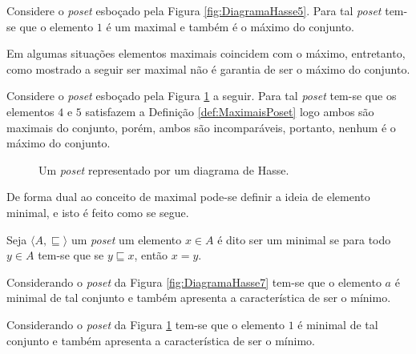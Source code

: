 \begin{exemplo}
	Considere o \textit{poset} esboçado pela Figura \ref{fig:DiagramaHasse5}. Para tal \textit{poset} tem-se que o elemento $1$ é um maximal e também é o máximo do conjunto.
\end{exemplo}

Em algumas situações elementos maximais coincidem com o máximo, entretanto, como mostrado a seguir ser maximal não é garantia de ser o máximo do conjunto.

\begin{exemplo}
  Considere o \textit{poset} esboçado pela Figura \ref{fig:DiagramaHasse8} a seguir. Para tal \textit{poset} tem-se que os elementos $4$ e $5$ satisfazem a Definição \ref{def:MaximaisPoset} logo ambos são maximais do conjunto, porém, ambos são incomparáveis, portanto, nenhum é o máximo do conjunto.
\end{exemplo}

\begin{figure}[h]
  \centering
{}
\caption{Um \textit{poset} representado por um diagrama de Hasse.}
\label{fig:DiagramaHasse8}
\end{figure}

De forma dual ao conceito de maximal pode-se definir a ideia de elemento minimal, e isto é feito como se segue.

\begin{definicao}\label{def:MinimalPoset}
Seja $\langle A, \sqsubseteq \rangle$ um \textit{poset}  um elemento $x \in A$ é dito ser um minimal se para todo $y \in A$ tem-se que se $y\sqsubseteq x$, então $x = y$.
\end{definicao}

\begin{exemplo}
Considerando o \textit{poset} da Figura \ref{fig:DiagramaHasse7} tem-se que o elemento $a$ é minimal de tal conjunto e também apresenta a característica de ser o mínimo.
\end{exemplo}

\begin{exemplo}
Considerando o \textit{poset} da Figura \ref{fig:DiagramaHasse8} tem-se que o elemento $1$ é minimal de tal conjunto e também apresenta a característica de ser o mínimo.
\end{exemplo}

